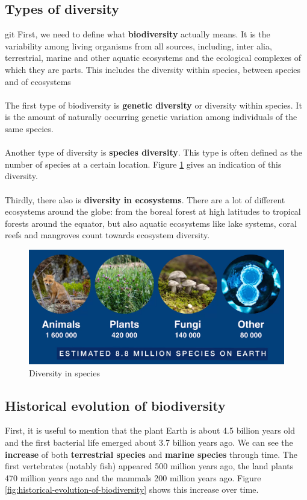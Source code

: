 \documentclass[../summary.tex]{subfiles}
\begin{document}
	\subsection{Types of diversity}git
	First, we need to define what \textbf{biodiversity} actually means. It is the variability among living organisms from all sources, including, inter alia, terrestrial, marine and other aquatic ecosystems and the ecological complexes of which they are parts. This includes the diversity within species, between species and of ecosystems
	\\
	\\
	The first type of biodiversity is \textbf{genetic diversity} or diversity within species. It is the amount of naturally occurring genetic variation among individuals of the same species. 
	\\
	\\
	Another type of diversity is \textbf{species diversity}. This type is often defined as the number of species at a certain location. Figure \ref{fig:diversity_species} gives an indication of this diversity.
	\\
	\\
	Thirdly, there also is \textbf{diversity in ecosystems}. There are a lot of different ecosystems around the globe: from the boreal forest at high latitudes to tropical forests around the equator, but also aquatic ecosystems like lake systems, coral reefs and mangroves count towards ecosystem diversity.
	\\
	\begin{figure}[H]
		\centering
		\includegraphics[width=0.75\linewidth]{images/2-diversity_species.png}
		\caption{Diversity in species}
		\label{fig:diversity_species}
	\end{figure}
	
	\subsection{Historical evolution of biodiversity}

	First, it is useful to mention that the plant Earth is about 4.5 billion years old and the first bacterial life emerged about 3.7 billion years ago. We can see the \textbf{increase} of both \textbf{terrestrial species} and \textbf{marine species} through time. The first vertebrates (notably fish) appeared 500 million years ago, the land plants 470 million years ago and the mammals 200 million years ago. Figure \ref{fig:historical-evolution-of-biodiversity} shows this increase over time.
	
\end{document}
